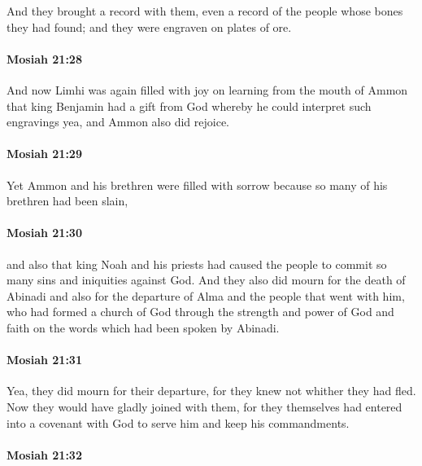 			And they brought a record with them,
			even a record of the people whose bones they had found;
			and they were engraven on plates of ore.

		\paragraph{Mosiah 21:28} %
			\label{MOSIAH-21-28}

			And now Limhi was again filled with joy
			on learning from the mouth of Ammon
			that king Benjamin had a gift from God
			whereby he could interpret such engravings
			yea, and Ammon also did rejoice.

		\paragraph{Mosiah 21:29} %
			\label{MOSIAH-21-29}

			Yet Ammon and his brethren were filled with sorrow
			because so many of his brethren had been slain,

		\paragraph{Mosiah 21:30} %
			\label{MOSIAH-21-30}

			and also that king Noah and his priests had caused the people
			to commit so many sins and iniquities against God.
			And they also did mourn for the death of Abinadi
			and also for the departure of Alma and the people that went with him,
			who had formed a church of God
			through the strength and power of God
			and faith on the words which had been spoken by Abinadi.

		\paragraph{Mosiah 21:31} %
			\label{MOSIAH-21-31}

			Yea, they did mourn for their departure,
			for they knew not whither they had fled.
			Now they would have gladly joined with them,
			for they themselves had entered into a covenant with God
			to serve him and keep his commandments.

		\paragraph{Mosiah 21:32} %
			\label{MOSIAH-21-32}

